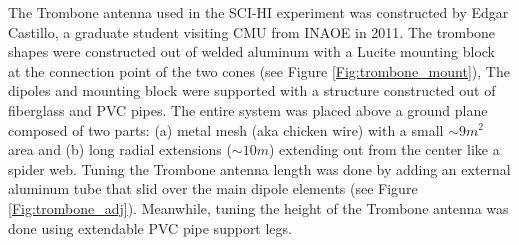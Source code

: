 The Trombone antenna used in the SCI-HI experiment was constructed by Edgar Castillo, a graduate student visiting CMU from INAOE in 2011. The trombone shapes were constructed out of welded aluminum with a Lucite mounting block at the connection point of the two cones (see Figure \ref{Fig:trombone_mount}), The dipoles and mounting block were supported with a structure constructed out of fiberglass and PVC pipes. The entire system was placed above a ground plane composed of two parts: (a) metal mesh (aka chicken wire) with a small $\sim9 m^2$ area and (b) long radial extensions ($\sim10 m$) extending out from the center like a spider web. Tuning the Trombone antenna length was done by adding an external aluminum tube that slid over the main dipole elements (see Figure \ref{Fig:trombone_adj}). Meanwhile, tuning the height of the Trombone antenna was done using extendable PVC pipe support legs.

